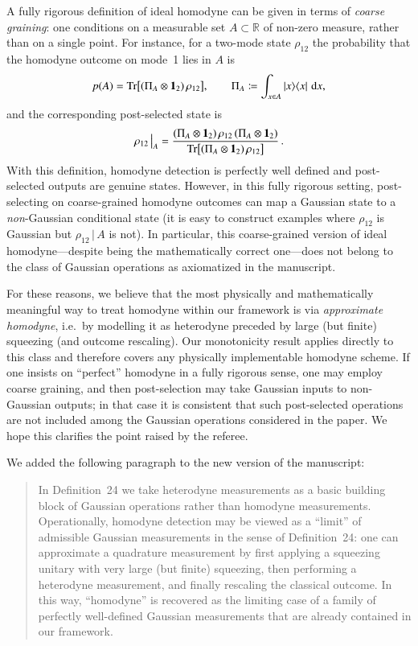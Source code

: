 \documentclass[a4paper,12pt]{article}
\newenvironment{Response}
{\noindent \color{RawSienna}{\bf Response:} }
{\vspace{0.4 cm}}
\begin{document}
\begin{Response}
A fully rigorous definition of ideal homodyne can be given in terms of \emph{coarse graining}: one conditions on a measurable set $A\subset\mathbb{R}$ of non-zero measure, rather than on a single point. For instance, for a two-mode state $\rho_{12}$ the probability that the homodyne outcome on mode~1 lies in $A$ is
\[
p(A)=\Tr\bigl[(\Pi_A\otimes \mathbf{1}_2)\,\rho_{12}\bigr],
\qquad
\Pi_A\coloneqq \int_{x\in A}\ket{x}\!\bra{x}\,\mathrm{d}x,
\]
and the corresponding post-selected state is
\[
\rho_{12}\,\big|_A
=
\frac{(\Pi_A\otimes \mathbf{1}_2)\,\rho_{12}\,(\Pi_A\otimes \mathbf{1}_2)}{\Tr\bigl[(\Pi_A\otimes \mathbf{1}_2)\,\rho_{12}\bigr]}\,.
\]
With this definition, homodyne detection is perfectly well defined and post-selected outputs are genuine states. However, in this fully rigorous setting, post-selecting on coarse-grained homodyne outcomes can map a Gaussian state to a \emph{non}-Gaussian conditional state (it is easy to construct examples where $\rho_{12}$ is Gaussian but $\rho_{12}\,|\,A$ is not). In particular, this coarse-grained version of ideal homodyne---despite being the mathematically correct one---does not belong to the class of Gaussian operations as axiomatized in the manuscript.

For these reasons, we believe that the most physically and mathematically meaningful way to treat homodyne within our framework is via \emph{approximate homodyne}, i.e.\ by modelling it as heterodyne preceded by large (but finite) squeezing (and outcome rescaling). Our monotonicity result applies directly to this class and therefore covers any physically implementable homodyne scheme. If one insists on ``perfect'' homodyne in a fully rigorous sense, one may employ coarse graining, and then post-selection may take Gaussian inputs to non-Gaussian outputs; in that case it is consistent that such post-selected operations are not included among the Gaussian operations considered in the paper. We hope this clarifies the point raised by the referee.



We added the following paragraph to the new version of the manuscript:
\begin{quote}
    In Definition~24 we take heterodyne measurements as a basic building block of Gaussian operations rather than homodyne measurements. Operationally, homodyne detection may be viewed as a ``limit'' of admissible Gaussian measurements in the sense of Definition~24: one can approximate a quadrature measurement by first applying a squeezing unitary with very large (but finite) squeezing, then performing a heterodyne measurement, and finally rescaling the classical outcome. In this way, ``homodyne'' is recovered as the limiting case of a family of perfectly well-defined Gaussian measurements that are already contained in our framework.


\end{quote}
\end{Response}
\end{document}

